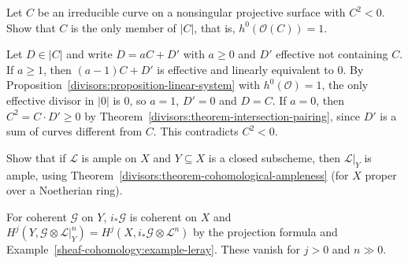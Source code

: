 \begin{exercise}\label{divisors:exercise-negative-curve}
Let $C$ be an irreducible curve on a nonsingular projective surface with $C^2 < 0$. Show that $C$ is the only member of $|C|$, that is, $h^0(\mathcal{O}(C)) = 1$.
\end{exercise}

\begin{solution}
Let $D \in |C|$ and write $D = aC + D'$ with $a \geq 0$ and $D'$ effective not containing $C$. If $a \geq 1$, then $(a - 1)C + D'$ is effective and linearly
equivalent to $0$. By Proposition~\ref{divisors:proposition-linear-system} with $h^0(\mathcal{O}) = 1$, the only effective divisor in $|0|$ is $0$, so $a = 1$, $D' = 0$ and
$D = C$. If $a = 0$, then $C^2 = C \cdot D' \geq 0$ by Theorem~\ref{divisors:theorem-intersection-pairing}, since $D'$ is a sum of curves different from $C$. This
contradicts $C^2 < 0$.
\end{solution}

\begin{exercise}\label{divisors:exercise-ample-restriction}
Show that if $\mathcal{L}$ is ample on $X$ and $Y \subseteq X$ is a closed subscheme, then $\mathcal{L}|_Y$ is ample, using Theorem~\ref{divisors:theorem-cohomological-ampleness}
(for $X$ proper over a Noetherian ring).
\end{exercise}

\begin{solution}
For coherent $\mathcal{G}$ on $Y$, $i_*\mathcal{G}$ is coherent on $X$ and $H^j(Y, \mathcal{G} \otimes \mathcal{L}|_Y^n) = H^j(X, i_*\mathcal{G} \otimes \mathcal{L}^n)$ by the projection formula and
Example~\ref{sheaf-cohomology:example-leray}. These vanish for $j > 0$ and $n \gg 0$.
\end{solution}
